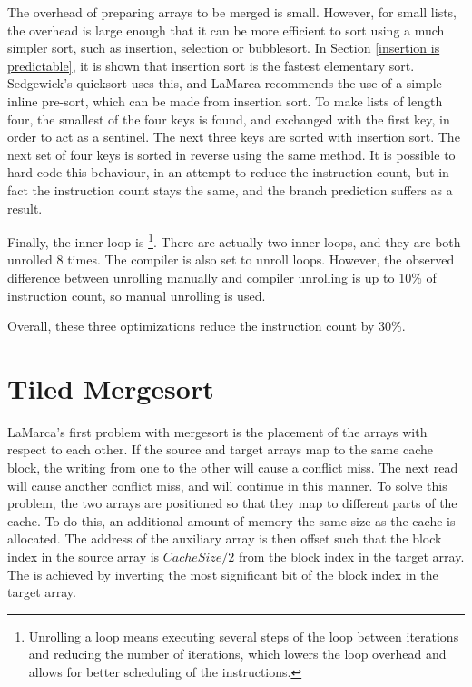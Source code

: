 The overhead of preparing arrays to be merged is small. However, for small
lists, the overhead is large enough that it can be more efficient to sort using
a much simpler sort, such as insertion, selection or bubblesort. In Section
\ref{insertion is predictable}, it is shown that insertion sort is the fastest
elementary sort. Sedgewick's quicksort uses this, and LaMarca recommends the use
of a simple inline pre-sort, which can be made from insertion sort. To make
lists of length four, the smallest of the four keys is found, and exchanged with
the first key, in order to act as a sentinel. The next three keys are sorted
with insertion sort. The next set of four keys is sorted in reverse using the
same method. It is possible to hard code this behaviour, in an attempt to reduce
the instruction count, but in fact the instruction count stays the same, and the
branch prediction suffers as a result.

Finally, the inner loop is \footnote{Unrolling a loop means
executing several steps of the loop between iterations and reducing the number
of iterations, which lowers the loop overhead and allows for better scheduling
of the instructions.}. There are actually two inner loops, and they are both
unrolled 8 times. The compiler is also set to unroll loops. However, the
observed difference between unrolling manually and compiler unrolling is up to
10\% of instruction count, so manual unrolling is used.

Overall, these three optimizations reduce the instruction count by 30\%.

\section{Tiled Mergesort}
\label{tiled mergesort}
LaMarca's first problem with mergesort is the placement of the arrays with
respect to each other. If the source and target arrays map to the same cache
block, the writing from one to the other will cause a conflict miss. The next
read will cause another conflict miss, and will continue in this manner. To
solve this problem, the two arrays are positioned so that they map to different
parts of the cache. To do this, an additional amount of memory the same size as
the cache is allocated. The address of
the auxiliary array is then offset such that the block index in the source array
is $CacheSize/2$ from the block index in the target array. The is achieved by
inverting the most significant bit of the block index in the target array.

